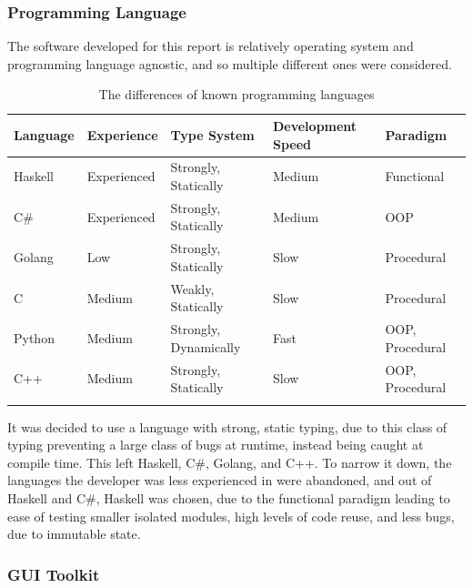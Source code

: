 \subsubsection{Programming Language}

The software developed for this report is relatively operating system and
programming language agnostic, and so multiple different ones were considered.

\begin{table}[H]
    \begin{adjustbox}{center}
    \begin{tabular}{l l l l l}
    \toprule
    Language             & Experience  & Type System            & Development Speed & Paradigm          \\
    \midrule
    Haskell              & Experienced & Strongly, Statically   & Medium            & Functional        \\ \addlinespace
    C\#                  & Experienced & Strongly, Statically   & Medium            & OOP               \\ \addlinespace
    Golang               & Low         & Strongly, Statically   & Slow              & Procedural        \\ \addlinespace
    C                    & Medium      & Weakly, Statically     & Slow              & Procedural        \\ \addlinespace
    Python               & Medium      & Strongly, Dynamically  & Fast              & OOP, Procedural   \\ \addlinespace
    C++                  & Medium      & Strongly, Statically   & Slow              & OOP, Procedural   \\ \addlinespace
    \bottomrule
    \end{tabular}
    \end{adjustbox}
    \caption{The differences of known programming languages}
\end{table}

It was decided to use a language with strong, static typing, due to this
class of typing preventing a large class of bugs at runtime, instead being
caught at compile time. This left Haskell, C\#, Golang, and C++. To narrow it
down, the languages the developer was less experienced in were abandoned,
and out of Haskell and C\#, Haskell was chosen, due to the functional paradigm
leading to ease of testing smaller isolated modules, high levels of code
reuse, and less bugs, due to immutable state.

\subsubsection{GUI Toolkit}


